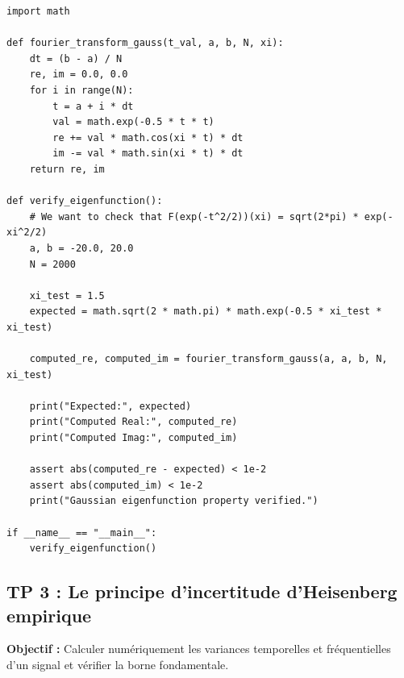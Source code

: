 \documentclass[11pt,a4paper]{article}
\begin{document}
\begin{lstlisting}
import math

def fourier_transform_gauss(t_val, a, b, N, xi):
    dt = (b - a) / N
    re, im = 0.0, 0.0
    for i in range(N):
        t = a + i * dt
        val = math.exp(-0.5 * t * t)
        re += val * math.cos(xi * t) * dt
        im -= val * math.sin(xi * t) * dt
    return re, im

def verify_eigenfunction():
    # We want to check that F(exp(-t^2/2))(xi) = sqrt(2*pi) * exp(-xi^2/2)
    a, b = -20.0, 20.0
    N = 2000

    xi_test = 1.5
    expected = math.sqrt(2 * math.pi) * math.exp(-0.5 * xi_test * xi_test)

    computed_re, computed_im = fourier_transform_gauss(a, a, b, N, xi_test)

    print("Expected:", expected)
    print("Computed Real:", computed_re)
    print("Computed Imag:", computed_im)

    assert abs(computed_re - expected) < 1e-2
    assert abs(computed_im) < 1e-2
    print("Gaussian eigenfunction property verified.")

if __name__ == "__main__":
    verify_eigenfunction()
\end{lstlisting}



\subsection*{TP 3 : Le principe d'incertitude d'Heisenberg empirique}

\textbf{Objectif :} Calculer numériquement les variances temporelles et fréquentielles d'un signal et vérifier la borne fondamentale.
\end{document}
